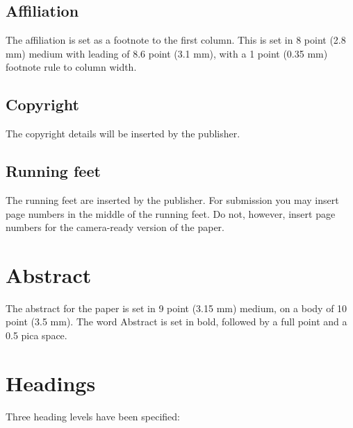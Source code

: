 \documentclass{ecai}
\begin{document}
\subsection{Affiliation}
The affiliation is set as a footnote to the first column. This is set
in 8 point (2.8 mm) medium with leading of 8.6 point (3.1 mm), with a
1 point (0.35 mm) footnote rule to column width.

\subsection{Copyright}
The copyright details will be inserted by the publisher.

\subsection{Running feet}
The running feet are inserted by the publisher. For submission you may
insert page numbers in the middle of the running feet. Do not,
however, insert page numbers for the camera-ready version of the
paper.

\section{Abstract}
The abstract for the paper is set in 9 point (3.15 mm) medium, on a
body of 10 point (3.5 mm). The word Abstract is set in bold, followed
by a full point and a 0.5 pica space.

\section{Headings}\label{heads}
Three heading levels have been specified:
\end{document}

